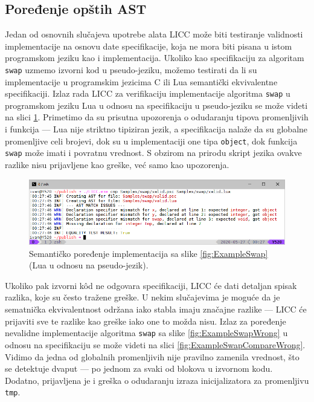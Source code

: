 \subsection{Poređenje opštih AST}
\label{subsec:ImplementationExampleComparer}

Jedan od osnovnih slučajeva upotrebe alata LICC može biti testiranje validnosti implementacije na osnovu date specifikacije, koja ne mora biti pisana u istom programskom jeziku kao i implementacija. Ukoliko kao specifikaciju za algoritam \texttt{swap} uzmemo izvorni kod u pseudo-jeziku, možemo testirati da li su implementacije u programskim jezicima C ili Lua semantički ekvivalentne specifikaciji. Izlaz rada LICC za verifikaciju implementacije algoritma \texttt{swap} u programskom jeziku Lua u odnosu na specifikaciju u pseudo-jeziku se može videti na slici \ref{fig:ExampleSwapCompareValid}. Primetimo da su prisutna upozorenja o odudaranju tipova promenljivih i funkcija --- Lua nije striktno tipiziran jezik, a specifikacija nalaže da su globalne promenljive celi brojevi, dok su u implementaciji one tipa \texttt{object}, dok funkcija \texttt{swap} može imati i povratnu vrednost. S obzirom na prirodu skript jezika ovakve razlike nisu prijavljene kao greške, već samo kao upozorenja. 

\begin{figure}[h!]
\centering
\includegraphics[scale=0.65]{images/eval/cmp_valid.png}
\caption{Semantičko poređenje implementacija sa slike \ref{fig:ExampleSwap} (Lua u odnosu na pseudo-jezik).}
\label{fig:ExampleSwapCompareValid}
\end{figure}

Ukoliko pak izvorni k\^od ne odgovara specifikaciji, LICC će dati detaljan spisak razlika, koje su često tražene greške. U nekim slučajevima je moguće da je sematnička ekvivalentnost održana iako stabla imaju značajne razlike --- LICC će prijaviti sve te razlike kao greške iako one to možda nisu. Izlaz za poređenje nevalidne implementacije algoritma \texttt{swap} sa slike \ref{fig:ExampleSwapWrong} u odnosu na specifikaciju se može videti na slici \ref{fig:ExampleSwapCompareWrong}. Vidimo da jedna od globalnih promenljivih nije pravilno zamenila vrednost, što se detektuje dvaput --- po jednom za svaki od blokova u izvornom kodu. Dodatno, prijavljena je i greška o odudaranju izraza inicijalizatora za promenljivu \texttt{tmp}.


